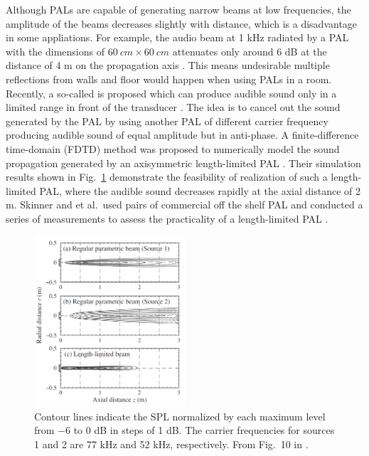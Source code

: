 Although PALs are capable of generating narrow beams at low frequencies, 
the amplitude of the beams decreases slightly with distance, which is a disadvantage in some appliations. 
{
    For example, the audio beam at 1 kHz radiated by a PAL with the dimensions of $\SI{60}{cm} \times \SI{60}{cm}$ attenuates only around 6 dB at the distance of 4 m on the propagation axis \cite{HolosonicsResearchLabs2018AudioSpotlightTechnical}.
This means undesirable multiple reflections from walls and floor would happen when using PALs in a room.
Recently, a so-called  is proposed which can produce audible sound only in a limited range in front of the transducer \cite{Hedberg2010SelfsilencedSoundBeam}.
The idea is to cancel out the sound generated by the PAL by using another PAL of different carrier frequency producing audible sound of equal amplitude but in anti-phase.
A finite-difference time-domain (FDTD) method was proposed to numerically model the sound propagation generated by an axisymmetric length-limited PAL \cite{Nomura2012NumericalSimulationParametric}. 
Their simulation results shown in Fig.~\ref{fig:nomuera:LLPAL} demonstrate the feasibility of realization of such a length-limited PAL, where the audible sound decreases rapidly at the axial distance of 2 m.
Skinner and et al.\  used pairs of commercial off the shelf PAL and conducted a series of measurements to assess the practicality of a length-limited PAL \cite{Skinner2019DemonstrationLengthLimited}. 
}

\begin{figure}[!htb]
    \centering
    \includegraphics[width = 0.5\textwidth]{fig/lengthlimitedPAL_resize.png}
    \caption{Contour lines indicate the SPL normalized by each maximum level from $-6$ to 0 dB in steps of 1 dB. The carrier frequencies for sources 1 and 2 are 77 kHz and 52 kHz, respectively. From Fig.~10 in \cite{Nomura2012NumericalSimulationParametric}.}
    \label{fig:nomuera:LLPAL}
\end{figure}

